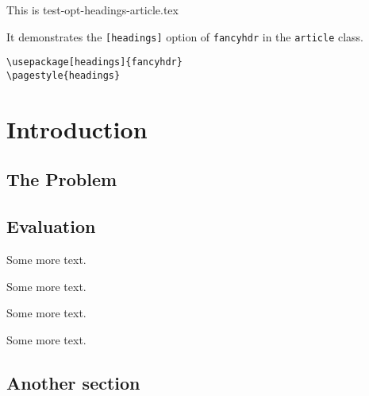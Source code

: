 \documentclass[twoside]{article}
\begin{document}
\tableofcontents

\bigskip

\noindent
\begin{boxedminipage}{\textwidth}
  This is test-opt-headings-article.tex

  It demonstrates the \texttt{[headings]} option of \texttt{fancyhdr} in
  the \texttt{article} class.

\begin{verbatim}
\usepackage[headings]{fancyhdr}
\pagestyle{headings}
\end{verbatim}
\end{boxedminipage}

\section{Introduction}

\lipsum

\subsection{The Problem}
\label{sec:problem}

\lipsum[1]

\subsection{Evaluation}

\lipsum[2-4]

Some more text.

Some more text.

Some more text.

Some more text.

\subsection{Another section}

\lipsum[3]
\end{document}
